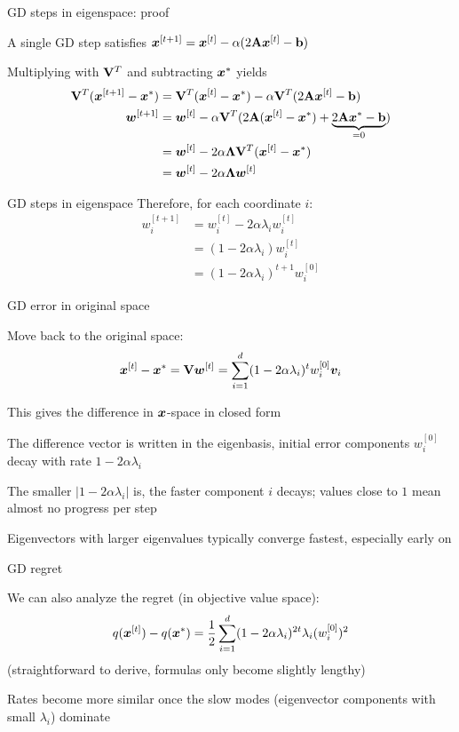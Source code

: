 \documentclass[11pt,compress,t,notes=noshow, xcolor=table]{beamer}
\begin{document}
\begin{framei}{GD steps in eigenspace: proof}
\item A single GD step satisfies $\bm{x}^{[t+1]} = \bm{x}^{[t]} - \alpha (2 \mathbf{A} \bm{x}^{[t]} - \mathbf{b})$
\item Multiplying with $\mathbf{V}^T$ and subtracting $\bm{x}^\ast$ yields
\begin{align*}
\mathbf{V}^T (\bm{x}^{[t+1]} - \bm{x}^\ast) &= \mathbf{V}^T (\bm{x}^{[t]} - \bm{x}^\ast) - \alpha \mathbf{V}^T (2 \mathbf{A} \bm{x}^{[t]} - \mathbf{b}) \\
\bm{w}^{[t+1]} &= \bm{w}^{[t]} - \alpha \mathbf{V}^T (2 \mathbf{A} (\bm{x}^{[t]} - \bm{x}^\ast) + \underbrace{2 \mathbf{A} \bm{x}^\ast - \mathbf{b}}_{=0}) \\
&= \bm{w}^{[t]} - 2 \alpha \bm{\Lambda} \mathbf{V}^T (\bm{x}^{[t]} - \bm{x}^\ast) \\
&= \bm{w}^{[t]} - 2 \alpha \bm{\Lambda} \bm{w}^{[t]}
\end{align*}
\end{framei}


\begin{framev}{GD steps in eigenspace}
Therefore, for each coordinate $i$:
\begin{align*}
w_i^{[t+1]} &= w_i^{[t]} - 2 \alpha \lambda_i w_i^{[t]} \\
&= (1 - 2 \alpha \lambda_i) w_i^{[t]} \\
&= (1 - 2 \alpha \lambda_i)^{t+1} w_i^{[0]}
\end{align*}
\end{framev}


\begin{framei}{GD error in original space}
\item Move back to the original space:
$$
\bm{x}^{[t]} - \bm{x}^\ast = \mathbf{V} \bm{w}^{[t]} = \sum_{i = 1}^{d} (1 - 2 \alpha \lambda_i)^t w_i^{[0]} \bm{v}_i
$$
\item This gives the difference in $\bm{x}$-space in closed form
\item The difference vector is written in the eigenbasis, initial error components $w_i^{[0]}$ decay with rate $1 - 2 \alpha \lambda_i$
\item The smaller $|1 - 2\alpha\lambda_i|$ is, the faster component $i$ decays; values close to $1$ mean almost no progress per step
\item Eigenvectors with larger eigenvalues typically converge fastest, especially early on
\end{framei}


\begin{framei}{GD regret}
\item We can also analyze the regret (in objective value space):
$$
q(\bm{x}^{[t]}) - q(\bm{x}^\ast) = \frac{1}{2} \sum_{i = 1}^{d} (1 - 2 \alpha \lambda_i)^{2t} \lambda_i (w_i^{[0]})^2
$$
(straightforward to derive, formulas only become slightly lengthy)
\item Rates become more similar once the slow modes (eigenvector components with small $\lambda_i$) dominate
\vfill
{}
\end{framei}
\end{document}
